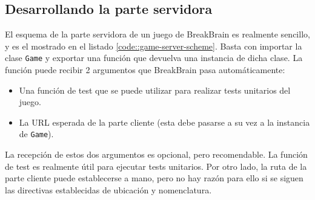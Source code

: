 \subsection{Desarrollando la parte servidora}

El esquema de la parte servidora de un juego de BreakBrain es realmente sencillo, y es el mostrado en el listado \ref{code::game-server-scheme}. Basta con importar la clase {\tt Game} y exportar una función que devuelva una instancia de dicha clase. La función puede recibir 2 argumentos que BreakBrain pasa automáticamente:

\begin{itemize}
\item Una función de test que se puede utilizar para realizar tests unitarios del juego.
\item La URL esperada de la parte cliente (esta debe pasarse a su vez a la instancia de {\tt Game}).
\end{itemize}

La recepción de estos dos argumentos es opcional, pero recomendable. La función de test es realmente útil para ejecutar tests unitarios. Por otro lado, la ruta de la parte cliente puede establecerse a mano, pero no hay razón para ello si se siguen las directivas establecidas de ubicación y nomenclatura.

